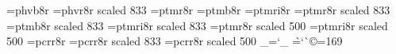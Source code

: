 \font\secbf=phvb8r
\font\smallss=phvr8r scaled 833 
\font\tenrm=ptmr8r
\font\tenbf=ptmb8r
\font\tenit=ptmri8r
\font\smallrm=ptmr8r scaled 833
\font\smallbf=ptmb8r scaled 833
\font\smallit=ptmri8r scaled 833
\font\tinyrm=ptmr8r scaled 500
\font\tinyit=ptmri8r scaled 500
\font\tentt=pcrr8r
\font\smalltt=pcrr8r scaled 833
\font\tinytt=pcrr8r scaled 500
\chardef\_=`\_
\chardef\`=`\`
\chardef\copyright=169
\chardef{}
\def\bs{\char92}       %
\def\lbrace{\char123}  %
\def\rbrace{\char125}  %
\def\vertbar{\char124} %
\def\vispace{\char"20} %
